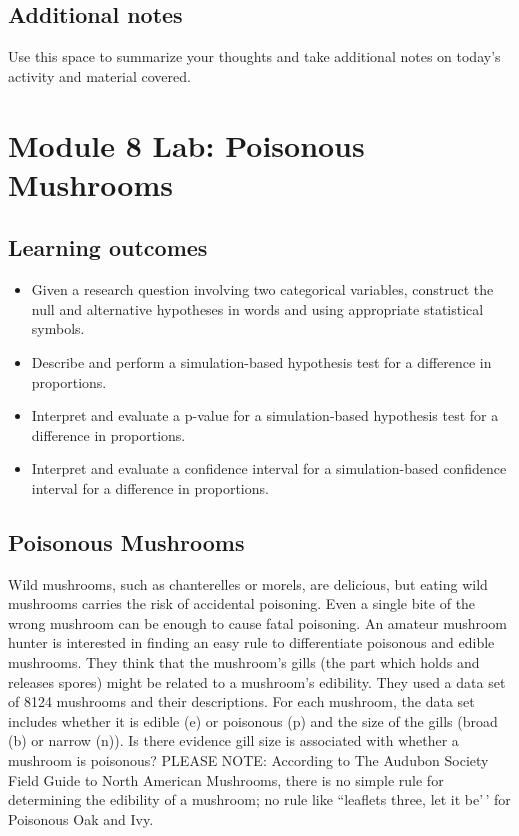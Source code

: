 \documentclass[
]{report}
\begin{document}
\hypertarget{additional-notes-13}{%
\subsection{Additional notes}\label{additional-notes-13}}

Use this space to summarize your thoughts and take additional notes on today's activity and material covered.

\newpage

\hypertarget{module-8-lab-poisonous-mushrooms}{%
\section{Module 8 Lab: Poisonous Mushrooms}\label{module-8-lab-poisonous-mushrooms}}


\hypertarget{learning-outcomes-16}{%
\subsection{Learning outcomes}\label{learning-outcomes-16}}

\begin{itemize}
\item
  Given a research question involving two categorical variables, construct the null and alternative hypotheses
  in words and using appropriate statistical symbols.
\item
  Describe and perform a simulation-based hypothesis test for a difference in proportions.
\item
  Interpret and evaluate a p-value for a simulation-based hypothesis test for a difference in proportions.
\item
  Interpret and evaluate a confidence interval for a simulation-based confidence interval for a difference in proportions.
\end{itemize}

\hypertarget{poisonous-mushrooms}{%
\subsection{Poisonous Mushrooms}\label{poisonous-mushrooms}}

Wild mushrooms, such as chanterelles or morels, are delicious, but eating wild mushrooms carries the risk of accidental poisoning. Even a single bite of the wrong mushroom can be enough to cause fatal poisoning. An amateur mushroom hunter is interested in finding an easy rule to differentiate poisonous and edible mushrooms. They think that the mushroom's gills (the part which holds and releases spores) might be related to a mushroom's edibility. They used a data set of 8124 mushrooms and their descriptions. For each mushroom, the data set includes whether it is edible (e) or poisonous (p) and the size of the gills (broad (b) or narrow (n)). Is there evidence gill size is associated with whether a mushroom is poisonous? PLEASE NOTE: According to The Audubon Society Field Guide to North American Mushrooms, there is no simple rule for determining the edibility of a mushroom; no rule like ``leaflets three, let it be'\,' for Poisonous Oak and Ivy.
\end{document}

